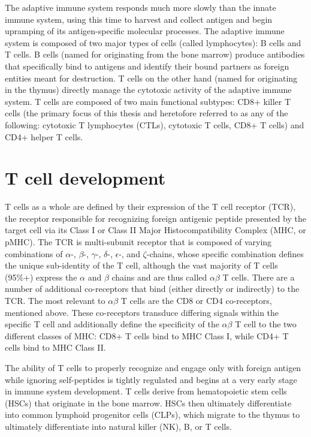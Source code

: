 The adaptive immune system responds much more slowly than the innate immune system, using this time to harvest and collect antigen and begin upramping of its antigen-specific molecular processes. The adaptive immune system is composed of two major types of cells (called lymphocytes): B cells and T cells. B cells (named for originating from the bone marrow) produce antibodies that specifically bind to antigens and identify their bound partners as foreign entities meant for destruction. T cells on the other hand (named for originating in the thymus) directly manage the cytotoxic activity of the adaptive immune system. T cells are composed of two main functional subtypes: CD8+ killer T cells (the primary focus of this thesis and heretofore referred to as any of the following: cytotoxic T lymphocytes (CTLs), cytotoxic T cells, CD8+ T cells) and CD4+ helper T cells. 

\section{T cell development}
T cells as a whole are defined by their expression of the T cell receptor (TCR), the receptor responsible for recognizing foreign antigenic peptide presented by the target cell via its Class I or Class II Major Histocompatibility Complex (MHC, or pMHC). The TCR is multi-subunit receptor that is composed of varying combinations of $\alpha$-, $\beta$-, $\gamma$-, $\delta$-, $\epsilon$-, and $\zeta$-chains, whose specific combination defines the unique sub-identity of the T cell, although the vast majority of T cells (95\%+) express the $\alpha$ and $\beta$ chains and are thus called $\alpha \beta$ T cells. There are a number of additional co-receptors that bind (either directly or indirectly) to the TCR. The most relevant to $\alpha \beta$ T cells are the CD8 or CD4 co-receptors, mentioned above. These co-receptors transduce differing signals within the specific T cell and additionally define the specificity of the $\alpha \beta$ T cell to the two different classes of MHC: CD8+ T cells bind to MHC Class I, while CD4+ T cells bind to MHC Class II. 

The ability of T cells to properly recognize and engage only with foreign antigen while ignoring self-peptides is tightly regulated and begins at a very early stage in immune system development. T cells derive from hematopoietic stem cells (HSCs) that originate in the bone marrow. HSCs then ultimately differentiate into common lymphoid progenitor cells (CLPs), which migrate to the thymus to ultimately differentiate into natural killer (NK), B, or T cells. 

